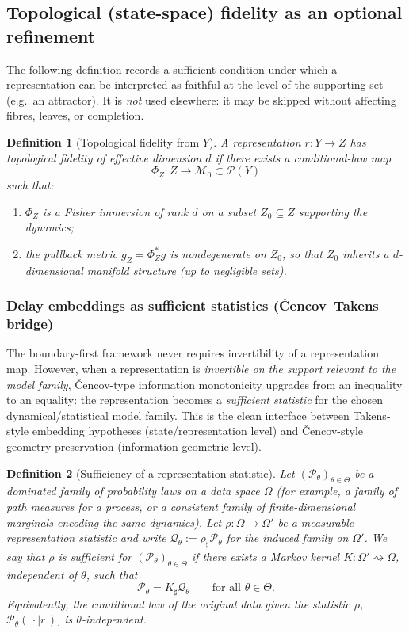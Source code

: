 \documentclass[11pt]{article}
\newtheorem{definition}{Definition}
\newcommand{\Pcal}{\mathcal{P}}
\begin{document}
\subsection{Topological (state-space) fidelity as an optional refinement}
The following definition records a sufficient condition under which a representation can be interpreted as faithful at the level of the supporting set (e.g.\ an attractor).
It is \emph{not} used elsewhere: it may be skipped without affecting fibres, leaves, or completion.

\begin{definition}[Topological fidelity from $Y$]
A representation $r:Y\to Z$ has \emph{topological fidelity} of effective
dimension $d$ if there exists a conditional-law map
\[
  \Phi_Z : Z \to \mathcal M_0 \subset \Pcal(Y)
\]
such that:
\begin{enumerate}[label=(T\arabic*),leftmargin=1.8em]
  \item $\Phi_Z$ is a Fisher immersion of rank $d$ on a subset
  $Z_0\subseteq Z$ supporting the dynamics;
  \item the pullback metric $g_Z = \Phi_Z^\ast g$ is nondegenerate on
  $Z_0$, so that $Z_0$ inherits a $d$-dimensional manifold structure
  (up to negligible sets).
\end{enumerate}
\end{definition}

\subsubsection*{Delay embeddings as sufficient statistics (Čencov--Takens bridge)}
The boundary-first framework never requires invertibility of a representation map.
However, when a representation is \emph{invertible on the support relevant to the
model family}, Čencov-type information monotonicity upgrades from an inequality
to an equality: the representation becomes a \emph{sufficient statistic} for the
chosen dynamical/statistical model family.  This is the clean interface between
Takens-style embedding hypotheses (state/representation level) and Čencov-style
geometry preservation (information-geometric level).

\begin{definition}[Sufficiency of a representation statistic]
\label{def:sufficiency-statistic}
Let $(\Pcal_\theta)_{\theta\in\Theta}$ be a dominated family of probability laws
on a data space $\Omega$ (for example, a family of path measures for a process,
or a consistent family of finite-dimensional marginals encoding the same
dynamics).  Let $\rho:\Omega\to\Omega'$ be a measurable \emph{representation statistic}
and write $\mathcal Q_\theta := \rho_\sharp \Pcal_\theta$ for the induced family on
$\Omega'$.
We say that $\rho$ is \emph{sufficient for} $(\Pcal_\theta)_{\theta\in\Theta}$ if
there exists a Markov kernel $K:\Omega'\rightsquigarrow \Omega$, independent of
$\theta$, such that
\[
  \Pcal_\theta = K_\sharp \mathcal Q_\theta
  \qquad\text{for all }\theta\in\Theta.
\]
Equivalently, the conditional law of the original data given the statistic $\rho$,
$\Pcal_\theta(\,\cdot\mid r\,)$, is $\theta$-independent.
\end{definition}
\end{document}
